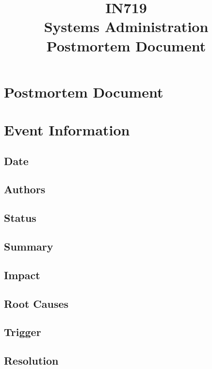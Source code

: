 \documentclass{article}   	%
\title{IN719\\Systems Administration\\Postmortem Document}
\date{}
\begin{document}
\section*{Postmortem Document}

\section{Event Information}

\subsection{Date}

\subsection{Authors}

\subsection{Status}

\subsection{Summary}

\vspace{12mm}

\subsection{Impact}

\vspace{6mm}

\subsection{Root Causes}

\vspace{12mm}

\subsection{Trigger}

\vspace{6mm}

\subsection{Resolution}
\end{document}

